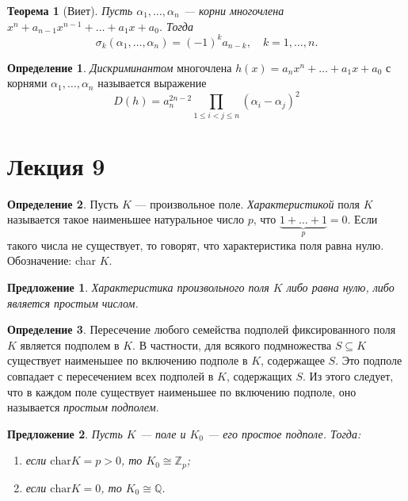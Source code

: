 \documentclass[a4paper]{article}
\theoremstyle{plain}
\newtheorem*{theorem}{Теорема}
\newtheorem{proposal}{Предложение}
\theoremstyle{definition}
\newtheorem{definition}{Определение}
\numberwithin{definition}{section}
\numberwithin{proposal}{section}
\begin{document}
\begin{theorem}[Виет]
Пусть \(\alpha_1, \dots, \alpha_n\) --- корни многочлена \(x^n + a_{n-1}x^{n-1} + \dots + a_1x + a_0\). Тогда
\begin{equation*}
	\sigma_k(\alpha_1, \dots, \alpha_n) = (-1)^k a_{n-k}, \quad k = 1, \dots, n.
\end{equation*}
\end{theorem}

\begin{definition}
\emph{Дискриминантом} многочлена \(h(x) = a_nx^n + \dots + a_1x + a_0\) с корнями \(\alpha_1, \dots, \alpha_n\) называется выражение
\begin{equation*}
	D(h) = a_{n}^{2n-2} \prod_{1 \leqslant i < j \leqslant n} (\alpha_i - \alpha_j)^2
\end{equation*}
\end{definition}


\section{Лекция 9}

\begin{definition}
Пусть \(K\) --- произвольное поле. \emph{Характеристикой} поля \(K\) называется такое наименьшее натуральное число \(p\), что \(\underbrace{1 + \dots + 1}_p = 0\). Если такого числа не существует, то говорят, что характеристика поля равна нулю. Обозначение: char \(K\).
\end{definition}

\begin{proposal}
Характеристика произвольного поля \(K\) либо равна нулю, либо является простым числом.
\end{proposal}

\begin{definition}
Пересечение любого семейства подполей фиксированного поля \(K\) является подполем в \(K\). В частности, для всякого подмножества \(S \subseteq K\) существует наименьшее по включению подполе в \(K\), содержащее \(S\). Это подполе совпадает с пересечением всех подполей в \(K\), содержащих \(S\). Из этого следует, что в каждом поле существует наименьшее по включению подполе, оно называется \emph{простым подполем}.
\end{definition}

\begin{proposal}
Пусть \(K\) --- поле и \(K_0\) --- его простое подполе. Тогда:
\begin{enumerate}
	\item если \(\mathrm{char }K = p > 0\), то \(K_0 \cong \mathbb{Z}_p\);
	\item если \(\mathrm{char }K = 0\), то \(K_0 \cong \mathbb{Q}\).
\end{enumerate}
\end{proposal}
\end{document}
